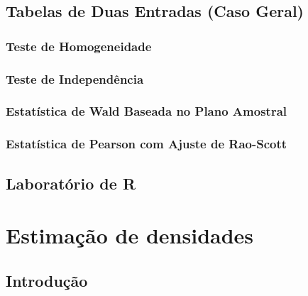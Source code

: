\documentclass[
]{book}
\begin{document}
\hypertarget{tabelas-de-duas-entradas-caso-geral}{%
\section{Tabelas de Duas Entradas (Caso Geral)}\label{tabelas-de-duas-entradas-caso-geral}}

\hypertarget{teste-de-homogeneidade-1}{%
\subsection{Teste de Homogeneidade}\label{teste-de-homogeneidade-1}}

\hypertarget{teste-de-independuxeancia-1}{%
\subsection{Teste de Independência}\label{teste-de-independuxeancia-1}}

\hypertarget{estatuxedstica-de-wald-baseada-no-plano-amostral-1}{%
\subsection{Estatística de Wald Baseada no Plano Amostral}\label{estatuxedstica-de-wald-baseada-no-plano-amostral-1}}

\hypertarget{estatuxedstica-de-pearson-com-ajuste-de-rao-scott}{%
\subsection{Estatística de Pearson com Ajuste de Rao-Scott}\label{estatuxedstica-de-pearson-com-ajuste-de-rao-scott}}

\hypertarget{laboratuxf3rio-de-r-5}{%
\section{Laboratório de R}\label{laboratuxf3rio-de-r-5}}

\hypertarget{estimauxe7uxe3o-de-densidades}{%
\chapter{Estimação de densidades}\label{estimauxe7uxe3o-de-densidades}}

\hypertarget{introduuxe7uxe3o-3}{%
\section{Introdução}\label{introduuxe7uxe3o-3}}
\end{document}
